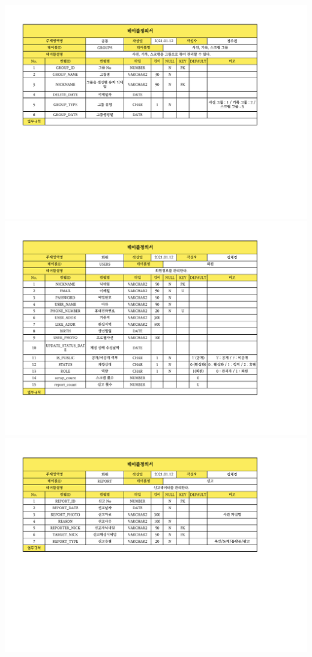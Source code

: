 \begin{landscape}
    {\includegraphics[width=30cm]{./Figure/Design/Display/table/table_01.pdf}} \\
    {\includegraphics[width=30cm]{./Figure/Design/Display/table/table_02.pdf}} \\
    {\includegraphics[width=30cm]{./Figure/Design/Display/table/table_03.pdf}} \\

\end{landscape}
